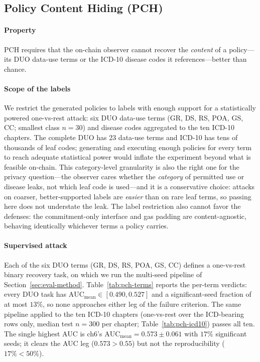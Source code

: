\subsection{Policy Content Hiding (PCH)}
\label{sec:eval-pch}

\paragraph{Property} PCH requires that the on-chain observer cannot recover the \emph{content} of a policy---its DUO data-use terms or the ICD-10 disease codes it references---better than chance.

\paragraph{Scope of the labels} We restrict the generated policies to labels with enough support for a statistically powered one-vs-rest attack: six DUO data-use terms (GR, DS, RS, POA, GS, CC; smallest class $n{=}30$) and disease codes aggregated to the ten ICD-10 chapters.
The complete DUO has 23 data-use terms and ICD-10 has tens of thousands of leaf codes; generating and executing enough policies for every term to reach adequate statistical power would inflate the experiment beyond what is feasible on-chain.
This category-level granularity is also the right one for the privacy question---the observer cares whether the \emph{category} of permitted use or disease leaks, not which leaf code is used---and it is a conservative choice: attacks on coarser, better-supported labels are \emph{easier} than on rare leaf terms, so passing here does not understate the leak.
The label restriction also cannot favor the defenses: the commitment-only interface and gas padding are content-agnostic, behaving identically whichever terms a policy carries.

\paragraph{Supervised attack} Each of the six DUO terms (GR, DS, RS, POA, GS, CC) defines a one-vs-rest binary recovery task, on which we run the multi-seed pipeline of Section~\ref{sec:eval-method}.
Table~\ref{tab:pch-terms} reports the per-term verdicts: every DUO task has $\mathrm{AUC}_{\text{mean}}\in[0.490,0.527]$ and a significant-seed fraction of at most $13\%$, so none approaches either leg of the failure criterion.
The same pipeline applied to the ten ICD-10 chapters (one-vs-rest over the ICD-bearing rows only, median test $n{=}300$ per chapter; Table~\ref{tab:pch-icd10}) passes all ten.
The single highest AUC is ch6's $\mathrm{AUC}_{\text{mean}}=0.573\pm0.061$ with $17\%$ significant seeds; it clears the AUC leg ($0.573>0.55$) but not the reproducibility ($17\%<50\%$).
